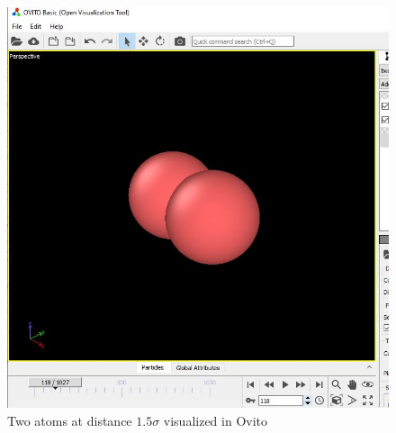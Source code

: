 \begin{figure}[h!]
        \centering 
        \includegraphics[scale=0.6]{./py/2dii_ovito.JPG} 
        \caption{Two atoms at distance $1.5 \sigma $ visualized in Ovito }
        \label{fig:2dii_ovito}
\end{figure}
